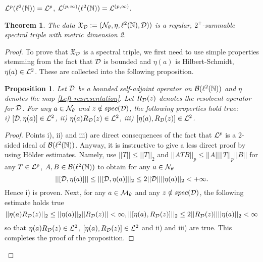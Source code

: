 \documentclass[a4paper]{jpconf}
\numberwithin{equation}{section}
\newtheorem{theorem}[Theorem]{Theorem}
\newtheorem{proposition}[Theorem]{Proposition}
\theoremstyle{nonumberplain}
\newtheorem{proof}{Proof}
\begin{document}
${\cal{L}}^p(\ell^2(\mathbb{N}))={\cal{L}}^p$, ${\cal{L}}^{(p,\infty)}(\ell^2(\mathbb{N}))={\cal{L}}^{(p,\infty)}$.
\begin{theorem}\label{th1}
The data $\mathfrak{X}_{{\cal{D}}}:=({\cal{N}}_\theta,\eta,\ell^2(\mathbb{N}), {\cal{D}}))$ is a regular, $2^+$-summable spectral triple with metric dimension 2.
\end{theorem}
\begin{proof}
To prove that $\mathfrak{X}_{{\cal{D}}}$ is a spectral triple, we first need to use simple properties stemming from the fact that ${\cal{D}}$ is bounded and $\eta(a)$ is Hilbert-Schmidt, $\eta(a)\in{\cal{L}}^2$. These are collected into the following proposition.
\begin{proposition}\label{technical-propert}
Let ${\cal{D}}$ be a bounded self-adjoint operator on ${\cal{B}}(\ell^2(\mathbb{N}))$ and $\eta$ denotes the map \eqref{Left-representation}. Let $R_{\cal{D}}(z)$ denotes the resolvent operator for ${\cal{D}}$.  For any $a\in{\cal{N}}_\theta$ and $z\notin spec({\cal{D}})$, the following properties hold true:\\
i) $[{\cal{D}},\eta(a)]\in{\cal{L}}^2$, ii) $\eta(a)R_{\cal{D}}(z)\in{\cal{L}}^2$, iii) $[\eta(a),R_{\cal{D}}(z)]\in{\cal{L}}^2$.
\end{proposition}
\begin{proof}
Points i), ii) and iii) are direct consequences of the fact that ${\cal{L}}^p$ is a 2-sided ideal of ${\cal{B}}(\ell^2(\mathbb{N}))$. Anyway, it is instructive to give a less direct proof by using H\"older estimates. Namely, use $||T||\le||T||_2$ and $||ATB||_p\le||A||||T||_p||B||$ for any $T\in{\cal{L}}^p$, $A,B\in{\cal{B}}(\ell^2(\mathbb{N}))$ to obtain for any $a\in{\cal{N}}_\theta$
\begin{equation}
||[{\cal{D}},\eta(a)]||\le||[{\cal{D}},\eta(a)]||_2\le2||{\cal{D}}||||\eta(a)||_2<+\infty\label{estimate-triple11}.
\end{equation}
Hence i) is proven. Next, for any $a\in{\cal{M}}_\theta$ and any $z\notin spec({\cal{D}})$, the following estimate holds true
\begin{equation}
||\eta(a)R_{\cal{D}}(z)||_2\le||\eta(a)||_2||R_{\cal{D}}(z)||<\infty, ||[\eta(a),R_{\cal{D}}(z)]||_2\le2||R_{\cal{D}}(z)||||\eta(a)||_2<\infty\label{estimate-triple22}
\end{equation}
so that $\eta(a)R_{{\cal{D}}}(z)\in{\cal{L}}^2$, $[\eta(a),R_{\cal{D}}(z)]\in{\cal{L}}^2$ and ii) and iii) are true. 
This completes the proof of the proposition.
\end{proof}


\end{proof}
\end{document}
